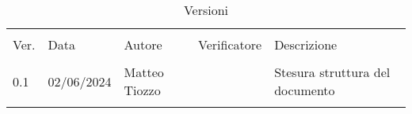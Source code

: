 \documentclass[italian,12pt]{article} %
\begin{document}


\newpage



\begin{table}[!h]
	\caption*{Versioni}
	\begin{center}
		\begin{tabular}{ l l l l l }
			\hline                                                                             \\[-2ex]
			Ver. & Data       & Autore        & Verificatore & Descrizione                     \\
			\hline                                                                             \\[-1.5ex]
			0.1  & 02/06/2024 & Matteo Tiozzo &              & Stesura struttura del documento \\
			\\[-1.5ex] \hline
		\end{tabular}
	\end{center}
\end{table}

\newpage

\tableofcontents

\newpage

\listoftables

\listoffigures

\newpage




\newpage



\newpage



\newpage



\newpage


\end{document}
